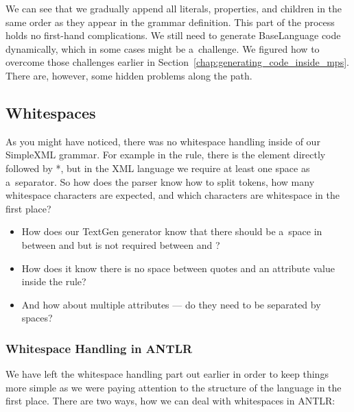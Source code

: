 We can see that we gradually append all literals, properties, and children in the same order as they appear in the grammar definition.
This part of the process holds no first-hand complications.
We still need to generate BaseLanguage code dynamically, which in some cases might be a~challenge.
We figured how to overcome those challenges earlier in Section~\ref{chap:generating_code_inside_mps}.
There are, however, some hidden problems along the path.

\subsection{Whitespaces}
\label{chap:whitespaces}

As you might have noticed, there was no whitespace handling inside of our SimpleXML grammar.
For example in the  rule, there is  the element directly followed by *, but in the XML language we require at least one space as a~separator.
So how does the parser know how to split tokens, how many whitespace characters are expected, and which characters are whitespace in the first place?

\begin{itemize}
	\item How does our TextGen generator know that there should be a~space in between  and  but is not required between \literal{\textless} and ?

	\item How does it know there is no space between quotes and an attribute value inside the  rule?

	\item And how about multiple attributes --- do they need to be separated by spaces?
\end{itemize}

\subsubsection{Whitespace Handling in ANTLR}

We have left the whitespace handling part out earlier in order to keep things more simple as we were paying attention to the structure of the language in the first place.
There are two ways, how we can deal with whitespaces in ANTLR:

